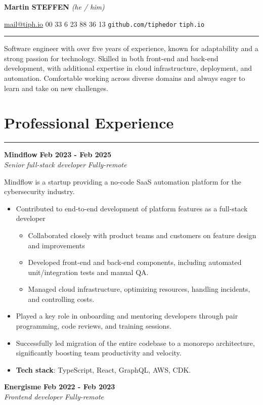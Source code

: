 \documentclass[11pt]{article}
\newcommand{\experience}[4]{%
  \vspace{5pt}
  \textbf{#2} \hfill \textbf{#3} \\
  \textit{#1} \hfill \textit{#4} \\
  \vspace{-10pt}
}
\newcommand{\cvsection}[1]{%
  \section*{#1}
    \vspace{-10pt}
    \hrule
    \vspace{10pt}
}
\begin{document}
\textbf{\Huge Martin STEFFEN} \textit{(he / him)}

\large{\href{mailto:mail@tiph.io}{mail@tiph.io}  00 33 6 23 88 36 13  \texttt{github.com/tiphedor}  \texttt{tiph.io}}

\vspace{10pt}
\hrule
\vspace{15pt}


Software engineer with over five years of experience, known for adaptability and a strong passion for technology. Skilled in both front-end and back-end development, with additional expertise in cloud infrastructure, deployment, and automation. Comfortable working across diverse domains and always eager to learn and take on new challenges.

\cvsection{Professional Experience}


\experience{Senior full-stack developer}{Mindflow}{Feb 2023 - Feb 2025}{Fully-remote}

Mindflow is a startup providing a no-code SaaS automation platform for the cybersecurity industry.

\begin{itemize}
    \item Contributed to end-to-end development of platform features as a full-stack developer
    \begin{itemize}
        \item Collaborated closely with product teams and customers on feature design and improvements
        \item Developed front-end and back-end components, including automated unit/integration tests and manual QA.
        \item Managed cloud infrastructure, optimizing resources, handling incidents, and controlling costs.
    \end{itemize}
    \item Played a key role in onboarding and mentoring developers through pair programming, code reviews, and training sessions.
    \item Successfully led migration of the entire codebase to a monorepo architecture, significantly boosting team productivity and velocity.
    \item \textbf{Tech stack}: TypeScript, React, GraphQL, AWS, CDK.
\end{itemize}

\experience{Frontend developer}{Energisme}{Feb 2022 - Feb 2023}{Fully-remote}
\end{document}
